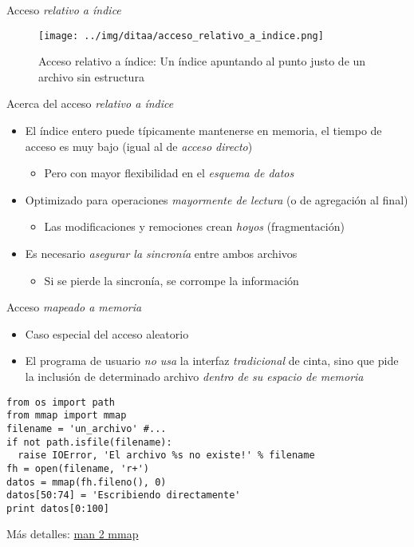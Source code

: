 \documentclass[presentation]{beamer}
\begin{document}
\begin{frame}[label={sec:orgc5b693c}]{Acceso \emph{relativo a índice}}
\begin{figure}[htbp]
\centering
\texttt{[image: ../img/ditaa/acceso\_relativo\_a\_indice.png]}
\caption{Acceso relativo a índice: Un índice apuntando al punto justo de un archivo sin estructura}
\end{figure}
\end{frame}

\begin{frame}[label={sec:org06dcf2b}]{Acerca del acceso \emph{relativo a índice}}
\begin{itemize}
\item El índice entero puede típicamente mantenerse en memoria, el tiempo
de acceso es muy bajo (igual al de \emph{acceso directo})
\begin{itemize}
\item Pero con mayor flexibilidad en el \emph{esquema de datos}
\end{itemize}
\item Optimizado para operaciones \emph{mayormente de lectura} (o de
agregación al final)
\begin{itemize}
\item Las modificaciones y remociones crean \emph{hoyos} (fragmentación)
\end{itemize}
\item Es necesario \emph{asegurar la sincronía} entre ambos archivos
\begin{itemize}
\item Si se pierde la sincronía, se corrompe la información
\end{itemize}
\end{itemize}
\end{frame}

\begin{frame}[label={sec:orgfa3d743},fragile]{Acceso \emph{mapeado a memoria}}
 \begin{itemize}
\item Caso especial del acceso aleatorio
\item El programa de usuario \emph{no usa} la interfaz \emph{tradicional} de cinta,
sino que pide la inclusión de determinado archivo \emph{dentro de su
espacio de memoria}
\end{itemize}
\begin{verbatim}
from os import path
from mmap import mmap
filename = 'un_archivo' #...
if not path.isfile(filename):
  raise IOError, 'El archivo %s no existe!' % filename
fh = open(filename, 'r+')
datos = mmap(fh.fileno(), 0)
datos[50:74] = 'Escribiendo directamente'
print datos[0:100]
\end{verbatim}
\begin{center}
Más detalles: \href{https://manpages.debian.org/jessie/manpages-dev/mmap.2.en.html}{man 2 mmap}
\end{center}
\end{frame}
\end{document}
